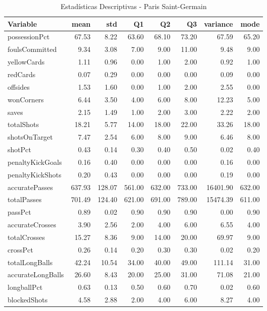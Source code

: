 \begin{table}[H]
\centering
\caption{Estadísticas Descriptivas - Paris Saint-Germain}
\label{tab:fra_psg}
\small
\begin{tabular}{lrrrrrrr}
\hline
Variable & mean & std & Q1 & Q2 & Q3 & variance & mode \\
\hline
possessionPct & 67.53 & 8.22 & 63.60 & 68.10 & 73.20 & 67.59 & 65.20 \\
foulsCommitted & 9.34 & 3.08 & 7.00 & 9.00 & 11.00 & 9.48 & 9.00 \\
yellowCards & 1.11 & 0.96 & 0.00 & 1.00 & 2.00 & 0.92 & 1.00 \\
redCards & 0.07 & 0.29 & 0.00 & 0.00 & 0.00 & 0.09 & 0.00 \\
offsides & 1.53 & 1.60 & 0.00 & 1.00 & 2.00 & 2.55 & 0.00 \\
wonCorners & 6.44 & 3.50 & 4.00 & 6.00 & 8.00 & 12.23 & 5.00 \\
saves & 2.15 & 1.49 & 1.00 & 2.00 & 3.00 & 2.22 & 2.00 \\
totalShots & 18.21 & 5.77 & 14.00 & 18.00 & 22.00 & 33.26 & 18.00 \\
shotsOnTarget & 7.47 & 2.54 & 6.00 & 8.00 & 9.00 & 6.46 & 8.00 \\
shotPct & 0.43 & 0.14 & 0.30 & 0.40 & 0.50 & 0.02 & 0.40 \\
penaltyKickGoals & 0.16 & 0.40 & 0.00 & 0.00 & 0.00 & 0.16 & 0.00 \\
penaltyKickShots & 0.20 & 0.43 & 0.00 & 0.00 & 0.00 & 0.19 & 0.00 \\
accuratePasses & 637.93 & 128.07 & 561.00 & 632.00 & 733.00 & 16401.90 & 632.00 \\
totalPasses & 701.49 & 124.40 & 621.00 & 691.00 & 789.00 & 15474.39 & 611.00 \\
passPct & 0.89 & 0.02 & 0.90 & 0.90 & 0.90 & 0.00 & 0.90 \\
accurateCrosses & 3.90 & 2.56 & 2.00 & 4.00 & 6.00 & 6.55 & 4.00 \\
totalCrosses & 15.27 & 8.36 & 9.00 & 14.00 & 20.00 & 69.97 & 9.00 \\
crossPct & 0.26 & 0.14 & 0.20 & 0.30 & 0.30 & 0.02 & 0.20 \\
totalLongBalls & 42.24 & 10.54 & 34.00 & 40.00 & 49.00 & 111.14 & 31.00 \\
accurateLongBalls & 26.60 & 8.43 & 20.00 & 25.00 & 31.00 & 71.08 & 21.00 \\
longballPct & 0.63 & 0.13 & 0.50 & 0.60 & 0.70 & 0.02 & 0.60 \\
blockedShots & 4.58 & 2.88 & 2.00 & 4.00 & 6.00 & 8.27 & 4.00 \\

\end{tabular}
\end{table}
